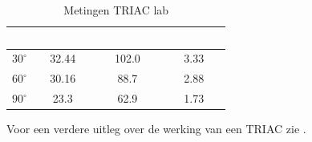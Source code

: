 \begin{table}
    \begin{center} 
    \begin{tabular}{|c|c|c|c|}
        \arrayrulecolor{purple}\hline
	    \rowcolor{purple} 
	    \multicolumn{1}{c}{\textcolor{white}{\textbf{$\alpha$}}} & \multicolumn{1}{c}{\textcolor{white}{\textbf{$U_{load}(V)$}}} &
        \multicolumn{1}{c}{\textcolor{white}{\textbf{$I_{load}(mA)$}}} & \multicolumn{1}{c}{\textcolor{white}{\textbf{$P_{load}(W)$}}} 
        \\ \hline
            $30^\circ$ & 32.44 & 102.0 & 3.33 
            \\ \hline
            $60^\circ$ & 30.16 & 88.7 & 2.88
            \\ \hline
            $90^\circ$ & 23.3 & 62.9 & 1.73
            \\ \hline
    \end{tabular}
    \caption{Metingen TRIAC lab}
    \label{tab:triac}
    \end{center}
\end{table}

Voor een verdere uitleg over de werking van een TRIAC zie \cite{triac}.